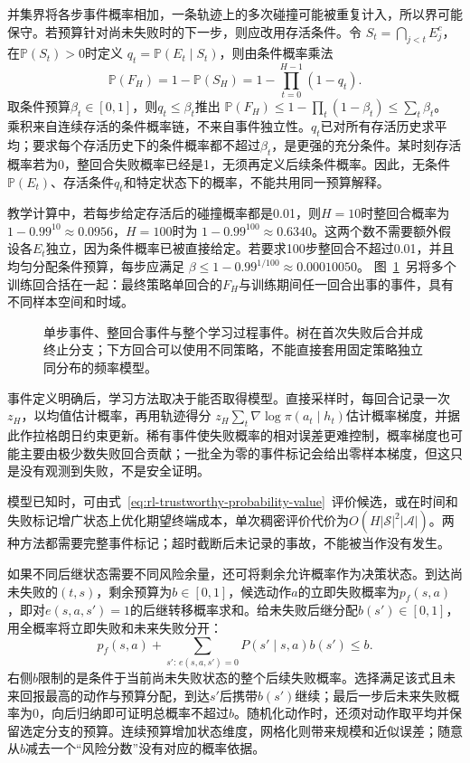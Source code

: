 并集界将各步事件概率相加，一条轨迹上的多次碰撞可能被重复计入，所以界可能保守。若预算针对尚未失败时的下一步，则应改用存活条件。令
$S_t=\bigcap_{j<t}E_j^c$，在$\mathbb P(S_t)>0$时定义
$q_t=\mathbb P(E_t\mid S_t)$，则由条件概率乘法
\[
  \mathbb P(F_H)=1-\mathbb P(S_H)
       =1-\prod_{t=0}^{H-1}(1-q_t).
\]
取条件预算$\beta_t\in[0,1]$，则$q_t\leq\beta_t$推出
$\mathbb P(F_H)\leq1-\prod_t(1-\beta_t)\leq\sum_t\beta_t$。
乘积来自连续存活的条件概率链，不来自事件独立性。$q_t$已对所有存活历史求平均；要求每个存活历史下的条件概率都不超过$\beta_t$，是更强的充分条件。某时刻存活概率若为0，整回合失败概率已经是1，无须再定义后续条件概率。因此，无条件$\mathbb P(E_t)$、存活条件$q_t$和特定状态下的概率，不能共用同一预算解释。

教学计算中，若每步给定存活后的碰撞概率都是0.01，则$H=10$时整回合概率为
$1-0.99^{10}\approx0.0956$，$H=100$时为
$1-0.99^{100}\approx0.6340$。这两个数不需要额外假设各$E_t$独立，因为条件概率已被直接给定。若要求100步整回合不超过0.01，并且均匀分配条件预算，每步应满足
$\beta\leq1-0.99^{1/100}\approx0.00010050$。
图~\ref{fig:rl-trustworthy-events}~另将多个训练回合括在一起：最终策略单回合的$F_H$与训练期间任一回合出事的事件，具有不同样本空间和时域。

\begin{figure}[htbp]
  \centering
  
  \caption{单步事件、整回合事件与整个学习过程事件。树在首次失败后合并成终止分支；下方回合可以使用不同策略，不能直接套用固定策略独立同分布的频率模型。}
  \label{fig:rl-trustworthy-events}
\end{figure}

事件定义明确后，学习方法取决于能否取得模型。直接采样时，每回合记录一次$z_H$，以均值估计概率，再用轨迹得分
$z_H\sum_t\nabla\log\pi(a_t\mid h_t)$估计概率梯度，并据此作拉格朗日约束更新。稀有事件使失败概率的相对误差更难控制，概率梯度也可能主要由极少数失败回合贡献；一批全为零的事件标记会给出零样本梯度，但这只是没有观测到失败，不是安全证明。

模型已知时，可由式~\eqref{eq:rl-trustworthy-probability-value}~评价候选，或在时间和失败标记增广状态上优化期望终端成本，单次稠密评价代价为$O(H|\mathcal S|^2|\mathcal A|)$。两种方法都需要完整事件标记；超时截断后未记录的事故，不能被当作没有发生。

如果不同后继状态需要不同风险余量，还可将剩余允许概率作为决策状态。到达尚未失败的$(t,s)$，剩余预算为$b\in[0,1]$，候选动作$a$的立即失败概率为$p_f(s,a)$，即对$e(s,a,s')=1$的后继转移概率求和。给未失败后继分配$b(s')\in[0,1]$，用全概率将立即失败和未来失败分开：
\begin{equation}
  p_f(s,a)+
    \sum_{s':\,e(s,a,s')=0}P(s'\mid s,a)b(s')\leq b.
  \label{eq:rl-trustworthy-risk-budget}
\end{equation}
右侧$b$限制的是条件于当前尚未失败状态的整个后续失败概率。选择满足该式且未来回报最高的动作与预算分配，到达$s'$后携带$b(s')$继续；最后一步后未来失败概率为0，向后归纳即可证明总概率不超过$b$。随机化动作时，还须对动作取平均并保留选定分支的预算。连续预算增加状态维度，网格化则带来规模和近似误差；随意从$b$减去一个“风险分数”没有对应的概率依据。

